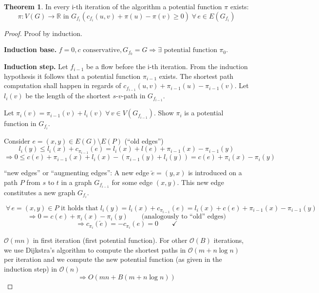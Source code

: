 \documentclass[a4paper]{article}
\theoremstyle{definition}
\newtheorem{theorem}{Theorem}
\newcommand{\gath}[2]{$#1$-$#2$-path} %
\newcommand{\fall}{\;\forall\,}
\begin{document}
\begin{theorem}
  In every i-th iteration of the algorithm a potential function $\pi$ exists:
  \[
    \pi: V(G) \rightarrow \mathbb{R} \text{ in } G_{f_i}(c_{f_i}(u,v) + \pi(u) - \pi(v) \geq 0)
    \fall e \in E(G_{f_i})
  \]
\end{theorem}

\begin{proof}
  Proof by induction.

  \textbf{Induction base.} $f=0, c \text{ conservative}, G_{f_0} = G \Rightarrow \exists \text{ potential function $\pi_0$}$.

  \textbf{Induction step.}
  Let $f_{i-1}$ be a flow before the i-th iteration. From the induction hypothesis it follows that a potential function $\pi_{i-1}$ exists. The shortest path computation shall happen in regards of
  $c_{f_{i-1}}(u,v) + \pi_{i-1}(u) - \pi_{i-1}(v)$. Let $l_i(v)$ be the length of the shortest \gath sv in $G_{f_{i-1}}$.

  Let $\pi_i(v) = \pi_{i-1}(v) + l_i(v) \fall v \in V(G_{f_{i-1}})$. Show $\pi_i$ is a potential function in $G_{f_i}$.

  Consider $e = (x, y) \in E(G) \setminus E(P)$ (``old edges'')
  \[
    l_i(y) \leq l_i(x) + c_{\pi_{i-1}}(e) = l_i(x) + l(e) + \pi_{i-1}(x) - \pi_{i-1}(y)
  \] \[
    \Rightarrow 0 \leq c(e) + \pi_{i-1}(x) + l_i(x) - \left(\pi_{i-1}(y) + l_i(y)\right)
      = c(e) + \pi_i(x) - \pi_i(y)
  \]

  ``new edges'' or ``augmenting edges'': A new edge $\overleftarrow{e} = (y, x)$ is introduced on a path $P$ from $s$ to $t$ in a graph $G_{f_{i-1}}$ for some edge $(x, y)$. This new edge constitutes a new graph $G_{f_i}$.

  \[
    \fall e = (x, y) \in P \text{ it holds that }
      l_i(y) = l_i(x) + c_{\pi_{i-1}}(e) = l_i(x) + c(e) + \pi_{i-1}(x) - \pi_{i-1}(y)
  \] \[
    \Rightarrow 0 = c(e) + \pi_i(x) - \pi_i(y) \qquad \text{(analogously to ``old'' edges)}
  \] \[
    \Rightarrow c_{\pi_i}(\overleftarrow{e}) = -c_{\pi_i}(e) = 0
      \qquad \checkmark
  \]

  $\mathcal{O}(mn)$ in first iteration (first potential function).
  For other $\mathcal{O}(B)$ iterations, we use Dijkstra's algorithm to compute the shortest paths in $\mathcal{O}(m + n \log{n})$ per iteration and we compute the new potential function (as given in the induction step) in $\mathcal{O}(n)$
  \[ \Rightarrow{O}(mn + B(m + n \log{n})) \]
\end{proof}
\end{document}

